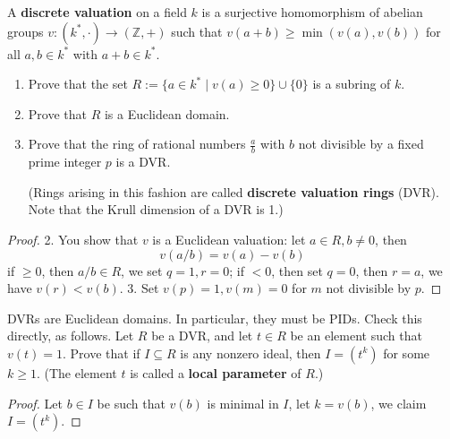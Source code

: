 \documentclass[openany]{book}
\begin{document}
\begin{prob}[2.19]
    A \textbf{discrete valuation} on a field \( k \) is a surjective homomorphism of abelian groups \( v : (k^*, \cdot) \to (\mathbb{Z}, +) \) such that \( v(a+b) \geq \min(v(a), v(b)) \) for all \( a, b \in k^* \) with \( a + b \in k^* \).

\begin{enumerate}
    \item Prove that the set \( R := \{a \in k^* \mid v(a) \geq 0\} \cup \{0\} \) is a subring of \( k \).
    \item Prove that \( R \) is a Euclidean domain.
    \item Prove that the ring of rational numbers \( \frac{a}{b} \) with \( b \) not divisible by a fixed prime integer \( p \) is a DVR.
    
    (Rings arising in this fashion are called \textbf{discrete valuation rings} (DVR). Note that the Krull dimension of a DVR is 1.)
\end{enumerate}
\end{prob}
\begin{proof}
    2. You show that $v$ is a Euclidean valuation: let $a\in R, b\neq 0$, then 
    \begin{equation*}
        v(a/b)=v(a)-v(b)
    \end{equation*}
    if $\geq 0$, then $a/b\in R$, we set $q=1, r=0$; if $<0$, then set $q=0$, then $r=a$, we have $v(r)<v(b)$. 3. Set $v(p)=1, v(m)=0$ for $m$ not divisible by $p$.
\end{proof}


\begin{prob}[2.20]
    DVRs are Euclidean domains. In particular, they must be PIDs. Check this directly, as follows. Let \( R \) be a DVR, and let \( t \in R \) be an element such that \( v(t) = 1 \). Prove that if \( I \subseteq R \) is any nonzero ideal, then \( I = (t^k) \) for some \( k \geq 1 \). (The element \( t \) is called a \textbf{local parameter} of \( R \).)
\end{prob}
\begin{proof}
    Let $b\in I$ be such that $v(b)$ is minimal in $I$, let $k=v(b)$, we claim $I=(t^k)$.
\end{proof}





\section{}
\end{document}

